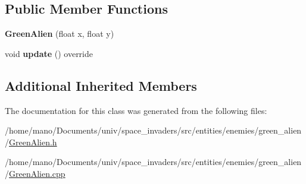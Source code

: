\subsection*{Public Member Functions}
\begin{DoxyCompactItemize}
\item 
\mbox{\label{classentities_1_1enemies_1_1green__alien_1_1GreenAlien_a77d12c28dac45b2ffacfa717ea32f139}} 
{\bfseries Green\+Alien} (float x, float y)
\item 
\mbox{\label{classentities_1_1enemies_1_1green__alien_1_1GreenAlien_a8489bee31c00c660f067172a97d3121d}} 
void {\bfseries update} () override
\end{DoxyCompactItemize}
\subsection*{Additional Inherited Members}


The documentation for this class was generated from the following files\+:\begin{DoxyCompactItemize}
\item 
/home/mano/\+Documents/univ/space\+\_\+invaders/src/entities/enemies/green\+\_\+alien/\hyperlink{GreenAlien_8h}{Green\+Alien.\+h}\item 
/home/mano/\+Documents/univ/space\+\_\+invaders/src/entities/enemies/green\+\_\+alien/\hyperlink{GreenAlien_8cpp}{Green\+Alien.\+cpp}\end{DoxyCompactItemize}
